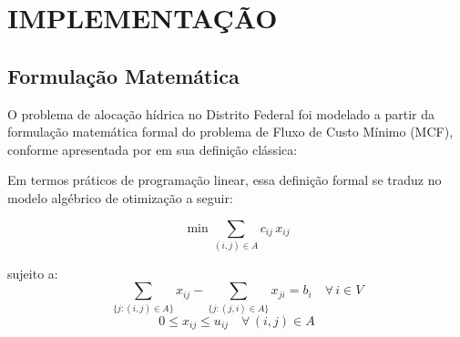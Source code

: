 \newpage

\section{IMPLEMENTAÇÃO}

\subsection{Formulação Matemática}

O problema de alocação hídrica no Distrito Federal foi modelado a partir da formulação matemática formal do problema de Fluxo de Custo Mínimo (MCF), conforme apresentada por \textcite{korte2012combinatorial} em sua definição clássica:

\begin{center}
\noindent{}
\end{center}

Em termos práticos de programação linear, essa definição formal se traduz no modelo algébrico de otimização a seguir:

\begin{equation}
  \min \sum_{(i,j) \in A} c_{ij} \, x_{ij}
\end{equation}

\noindent sujeito a:
\begin{equation}
  \sum_{\{j: (i,j) \in A\}} x_{ij} - \sum_{\{j: (j,i) \in A\}} x_{ji} = b_i \quad \forall \, i \in V
\end{equation}
\begin{equation}
  0 \leq x_{ij} \leq u_{ij} \quad \forall \, (i,j) \in A
\end{equation}

